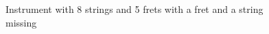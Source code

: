 \begin{figure}[H]
\centering
  \caption{Instrument with 8 strings and 5 frets with a fret and a string missing}
\end{figure}

